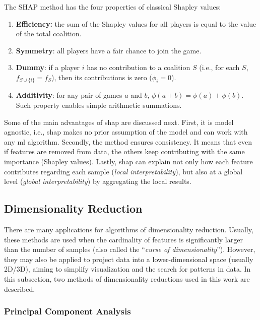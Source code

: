 The SHAP method has the four properties of classical Shapley values:

\begin{enumerate}
\item \textbf{Efficiency:} the sum of the Shapley values for all players is equal to the value of the total coalition. 
\item \textbf{Symmetry}: all players have a fair chance to join the game.
\item \textbf{Dummy}: if a player $i$ has no contribution to a coalition $S$ (i.e., for each $S$, $f_{S \cup \{i\}} = f_S$), then its contributions is zero ($\phi_i = 0$).
\item \textbf{Additivity}: for any pair of games $a$ and $b$, $\phi(a + b) = \phi(a) + \phi(b)$. Such property enables simple arithmetic summations.
\end{enumerate}

Some of the main advantages of \acs{shap} are discussed next. First, it is model agnostic, i.e., \acs{shap} makes no prior assumption of the model and can work with any \acs{ml} algorithm. Secondly, the method ensures consistency. It means that even if features are removed from data, the others keep contributing with the same importance (Shapley values). Lastly, \acs{shap} can explain not only how each feature contributes regarding each sample (\textit{local interpretability}), but also at a global level (\textit{global interpretability}) by aggregating the local results.

\subsection{Dimensionality Reduction}

There are many applications for algorithms of dimensionality reduction. Usually, these methods are used when the cardinality of features is significantly larger than the number of samples (also called the ``\textit{curse of dimensionality}''). However, they may also be applied to project data into a lower-dimensional space (usually 2D/3D), aiming to simplify visualization and the search for patterns in data. In this subsection, two methods of dimensionality reductions used in this work are described.

\subsubsection{Principal Component Analysis}
\label{sec:pca}

